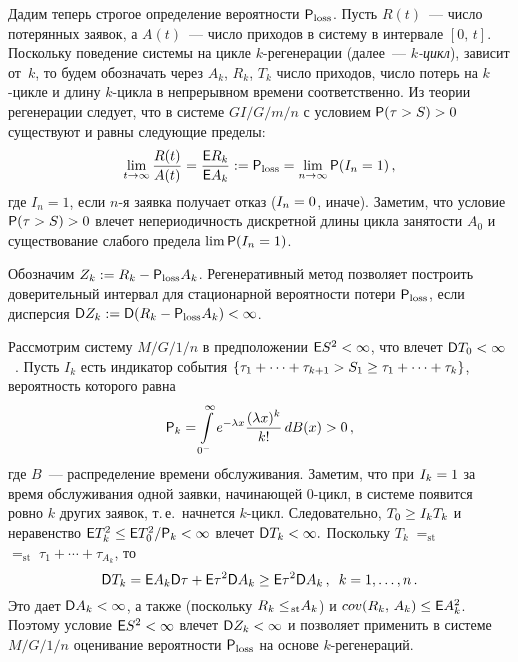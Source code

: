 \begin{multicols}{2}
 \pagebreak

Дадим теперь строгое определение веро\-ят\-ности ${\sf P}_{\mathrm{loss}}$.
 Пусть $R(t)$~--- число потерянных заявок, а $A(t)$~--- число приходов в систему в
интервале $[0,\,t]$.  Поскольку поведение системы на цикле $k$-ре\-ге\-не\-ра\-ции (далее~--- 
{\it $k$-цикл}), зависит от~$k$, то  будем  обозначать  через $A_k$, $R_k$, $T_k$ число
приходов, число потерь на $k$-цик\-ле и  длину $k$-цик\-ла в непрерывном времени соответственно.
  Из теории регенерации следует, что в системе $GI/G/m/n$ с условием
$\p(\tau>S)\hm>0$  существуют и равны следующие   пределы:
\begin{equation}
 \lim\limits_{t \to \infty}\displaystyle\frac{\displaystyle R(t)\mathstrut}{\displaystyle A(t)\mathstrut}= \displaystyle\frac{\displaystyle {\sf E} R_k\mathstrut}{\displaystyle {\sf E}
A_k\mathstrut}:={\sf P}_{\mathrm{loss}}=\lim\limits_{n\to\infty}{\sf P}(I_n=1)\,,
\label{e4b-mn}
\end{equation}
где $I_n=1$, если $n$-я  заявка получает отказ ($I_n\hm=0$, иначе).
Заметим, что условие ${\sf P}(\tau>S)>0$  влечет непериодичность
дискретной длины цикла занятости $A_0$ и существование слабого предела $\lim {\sf P}(I_n=1)$.


Обозначим $ Z_k:= R_k-{\sf P}_{\mathrm{loss}}A_k$.
      Регенеративный метод позволяет построить  доверительный интервал для
 стационарной   вероятности потери    ${\sf P}_{\mathrm{loss}}$,
если дисперсия $\D Z_k:=\D (R_k-\p_{\mathrm{loss}}A_k)\hm<\infty$.

Рассмотрим систему $M/G/1/n$ в предположении $\e S^2\hm<\infty$, что
влечет   $\D T_0\hm<\infty$~\cite{Wolff}. Пусть $I_k$ есть индикатор
события $\{\tau_1+\cdots+\tau_{k+1}>S_1\hm\ge \tau_1+\cdots+\tau_k\}$,
вероятность которого равна 
$$ 
{\sf P}_k =\int\limits_{0^-}^\infty e^{-\lambda x}\displaystyle\frac{\displaystyle (\lambda x)^k\mathstrut}{\displaystyle k!\mathstrut} \,dB(x)>0\,, 
$$ 
где $B$~--- распределение времени обслуживания. Заметим, что при $I_k\hm=1$  за время
обслуживания одной заявки, начинающей 0-цикл, в системе появится
ровно $k$  других заявок, т.\,е.\ начнется $k$-цикл. Следовательно,  
$T_0\hm\ge I_k T_k$ и  неравенство $ \e T_k^2\hm\le \e T_0^2/\p_k\hm<\infty $
влечет $\D T_k\hm<\infty.$ Поскольку
$T_k\;{=}_{\!\mathrm{st}}$\linebreak ${=}_{\!\mathrm{st}}\;\tau_1+\cdots+\tau_{A_k}$, то 
\begin{equation*} 
{\sf D} T_k={\sf E} A_k {\sf D} \tau + {\sf E} \tau^2{\sf D} A_k \ge {\sf E} \tau^2{\sf D}
A_k\,,\enskip k=1,\ldots,n\,. 
\end{equation*} 
Это дает  $\D A_k\hm<\infty$, а
также (поскольку $R_k\hm\le{\!_{\mathrm{st}}} A_k$) и $cov(R_k,\,A_k)\hm\le \e A_k^2$.
Поэтому условие $\e S^2\hm<\infty$ влечет $\D Z_k\hm<\infty$ и позволяет
применить в сис\-те\-ме $M/G/1/n$ оценивание вероятности ${\sf P}_{\mathrm{loss}}$ на
основе $k$-ре\-ге\-не\-раций.


\end{multicols}
